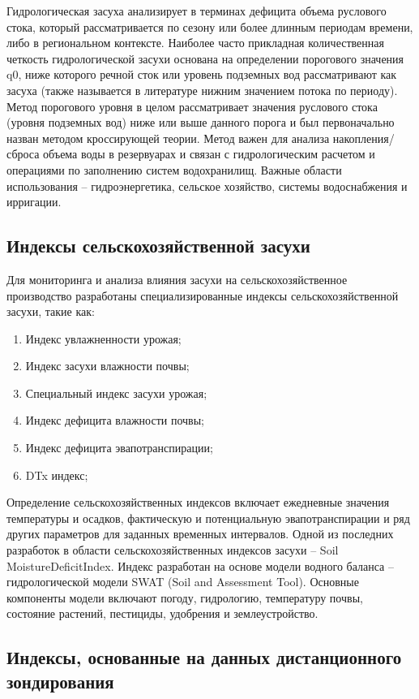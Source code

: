 Гидрологическая засуха анализирует в терминах дефицита объема руслового стока, который рассматривается по сезону или более длинным периодам времени, либо в региональном контексте.
Наиболее часто прикладная количественная четкость гидрологической засухи основана на определении порогового значения q0, ниже которого речной сток или уровень подземных вод рассматривают как засуха (также называется в литературе нижним значением потока по периоду). Метод порогового уровня в целом рассматривает значения руслового стока (уровня подземных вод) ниже или выше данного порога и был первоначально назван методом кроссирующей теории. Метод важен для анализа накопления/сброса объема воды в резервуарах и связан с гидрологическим расчетом и операциями по заполнению систем водохранилищ. Важные области использования – гидроэнергетика, сельское хозяйство, системы водоснабжения и ирригации.

\subsection{Индексы сельскохозяйственной засухи}

Для мониторинга и анализа влияния засухи на сельскохозяйственное производство разработаны специализированные индексы сельскохозяйственной засухи, такие как:

\begin{enumerate}
	\item Индекс увлажненности урожая;
	\item Индекс засухи влажности почвы;
	\item Специальный индекс засухи урожая;
	\item Индекс дефицита влажности почвы;
	\item Индекс дефицита эвапотранспирации;
	\item DTx индекс;
\end{enumerate}

Определение сельскохозяйственных индексов включает ежедневные значения температуры и осадков, фактическую и потенциальную эвапотранспирации и ряд других параметров для заданных временных интервалов.
Одной из последних разработок в области сельскохозяйственных индексов засухи – Soil MoistureDeficitIndex. Индекс разработан на основе модели водного баланса – гидрологической модели SWAT (Soil and Assessment Tool). Основные компоненты модели включают погоду, гидрологию, температуру почвы, состояние растений, пестициды, удобрения и землеустройство.

\subsection{Индексы, основанные на данных дистанционного зондирования}

